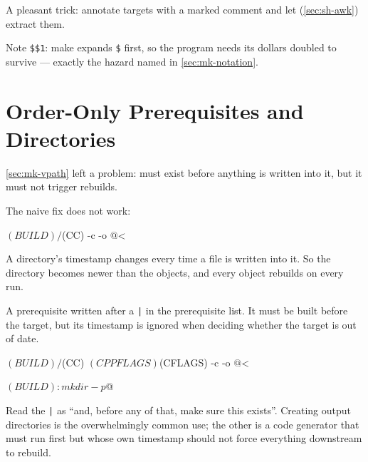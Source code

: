 \begin{eg}
	A pleasant trick: annotate targets with a marked comment and let
	 (\autoref{sec:sh-awk}) extract them.
	Note \texttt{\$\$1}: make expands \texttt{\$} first, so the  program
	needs its dollars doubled to survive --- exactly the hazard named in
	\autoref{sec:mk-notation}.
\end{eg}

\section{Order-Only Prerequisites and Directories}\label{sec:mk-orderonly}

\autoref{sec:mk-vpath} left a problem:  must exist before anything
is written into it, but it must not trigger rebuilds.

The naive fix does not work:

\begin{makecode}
$(BUILD)/%
    $(CC) -c -o $@ $<
\end{makecode}

A directory's timestamp changes every time a file is written into it. So the
directory becomes newer than the objects, and every object rebuilds on every
run.

\begin{definition}
	A prerequisite written after a \texttt{|} in the prerequisite list. It must be
	built before the target, but its timestamp is ignored when deciding whether the
	target is out of date.
\end{definition}

\begin{makecode}
$(BUILD)/%
    $(CC) $(CPPFLAGS) $(CFLAGS) -c -o $@ $<

$(BUILD):
    mkdir -p $@
\end{makecode}

\begin{note}
	Read the \texttt{|} as ``and, before any of that, make sure this exists''.
	Creating output directories is the overwhelmingly common use; the other is a
	code generator that must run first but whose own timestamp should not force
	everything downstream to rebuild.
\end{note}

